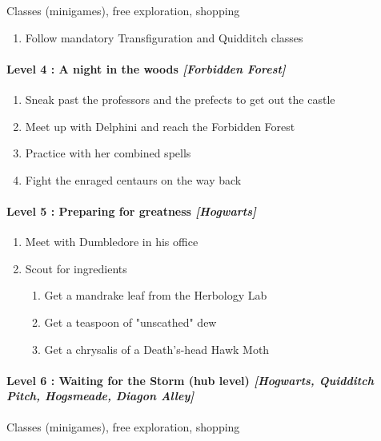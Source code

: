 Classes (minigames), free exploration, shopping
\begin{enumerate}[1)]
	\item Follow mandatory Transfiguration and Quidditch classes
\end{enumerate}

\paragraph{Level 4 : A night in the woods \textit{[Forbidden Forest]}}
\begin{enumerate}[1)]
	\item Sneak past the professors and the prefects to get out the castle
	\item Meet up with Delphini and reach the Forbidden Forest
	\item Practice with her combined spells
	\item Fight the enraged centaurs on the way back
\end{enumerate}

\paragraph{Level 5 : Preparing for greatness \textit{[Hogwarts]}}
\begin{enumerate}[1)]
	\item Meet with Dumbledore in his office
	\item Scout for ingredients
	\begin{enumerate}[1.]
		\item Get a mandrake leaf from the Herbology Lab
		\item Get a teaspoon of "unscathed" dew
		\item Get a chrysalis of a Death's-head Hawk Moth
	\end{enumerate}
\end{enumerate}

\paragraph{Level 6 : Waiting for the Storm (hub level) \textit{[Hogwarts, Quidditch Pitch, Hogsmeade, Diagon Alley]}}

Classes (minigames), free exploration, shopping

